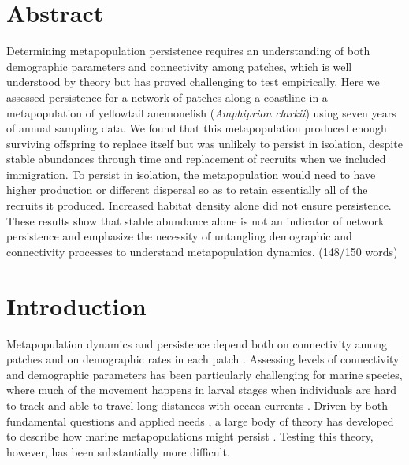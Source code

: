 \documentclass[12pt, oneside]{article}   	%
\begin{document}
\section*{Abstract}
Determining metapopulation persistence requires an understanding of both demographic parameters and connectivity among patches, which is well understood by theory but has proved challenging to test empirically. Here we assessed persistence for a network of patches along a coastline in a metapopulation of yellowtail anemonefish (\textit{Amphiprion clarkii}) using seven years of annual sampling data. We found that this metapopulation produced enough surviving offspring to replace itself but was unlikely to persist in isolation, despite stable abundances through time and replacement of recruits when we included immigration. To persist in isolation, the metapopulation would need to have higher production or different dispersal so as to retain essentially all of the recruits it produced. Increased habitat density alone did not ensure persistence. These results show that stable abundance alone is not an indicator of network persistence and emphasize the necessity of untangling demographic and connectivity processes to understand metapopulation dynamics. (148/150 words)



\section*{Introduction}
Metapopulation dynamics and persistence depend both on connectivity among patches and on demographic rates in each patch \citep{hastings_persistence_2006, hanski1998metapopulation}. Assessing levels of connectivity and demographic parameters has been particularly challenging for marine species, where much of the movement happens in larval stages when individuals are hard to track and able to travel long distances with ocean currents \citep{white2019connectivity}. Driven by both fundamental questions and applied needs \citep{botsford_dependence_2001,white_population_2010}, a large body of theory has developed to describe how marine metapopulations might persist \citep{botsford2019population}. Testing this theory, however, has been substantially more difficult.
\end{document}
